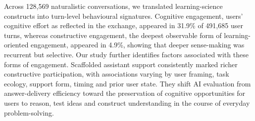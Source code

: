 { Across 128,569 naturalistic conversations, we translated learning-science constructs into turn-level behavioural signatures. Cognitive engagement, users' cognitive effort as reflected in the exchange, appeared in 31.9\% of 491,685 user turns, whereas constructive engagement, the deepest observable form of learning-oriented engagement, appeared in 4.9\%, showing that deeper sense-making was recurrent but selective. Our study further identifies factors associated with these forms of engagement. Scaffolded assistant support consistently marked richer constructive participation, with associations varying by user framing, task ecology, support form, timing and prior user state.  They shift AI evaluation from answer-delivery efficiency toward the preservation of cognitive opportunities for users to reason, test ideas and construct understanding in the course of everyday problem-solving.








}
